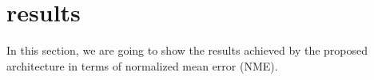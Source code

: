 \section{results}\label{sect:result}
In this section, we are going to show the results achieved by the proposed architecture in terms of normalized mean error (NME).
